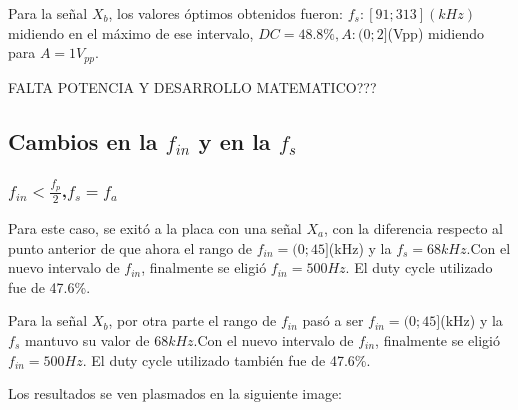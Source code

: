 \documentclass[../../ASSD_TP1_G7.tex]{subfiles}
\begin{document}
Para la señal $X_{b}$, los valores óptimos obtenidos fueron: $f_{s}:[91;313](kHz)$midiendo
en el máximo de ese intervalo, $DC=48.8\%,$$A:(0;2]$(Vpp) midiendo
para $A=1V_{pp}$.

FALTA POTENCIA Y DESARROLLO MATEMATICO???

\subsection{Cambios en la $f_{in}$ y en la $f_{s}$}

\subsubsection{$f_{in}<\frac{f_{p}}{2}$,$f_{s}=f_{a}$}

Para este caso, se exitó a la placa con una señal $X_{a}$, con la
diferencia respecto al punto anterior de que ahora el rango de $f_{in}=(0;45]$(kHz)
y la $f_{s}=68kHz.$Con el nuevo intervalo de $f_{in}$, finalmente
se eligió $f_{in}=500Hz.$ El duty cycle utilizado fue de 47.6\%.

Para la señal $X_{b}$, por otra parte el rango de $f_{in}$ pasó
a ser $f_{in}=(0;45]$(kHz) y la $f_{s}$ mantuvo su valor de $68kHz.$Con
el nuevo intervalo de $f_{in}$, finalmente se eligió $f_{in}=500Hz.$
El duty cycle utilizado también fue de 47.6\%.

Los resultados se ven plasmados en la siguiente image:
\end{document}
